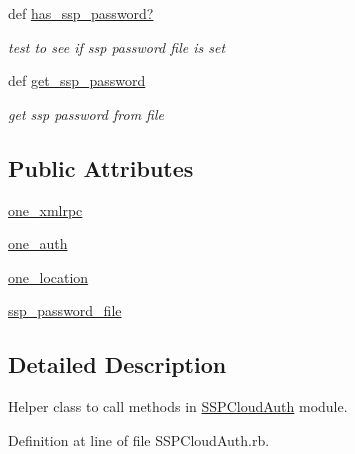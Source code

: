 \begin{DoxyCompactItemize}
\-d\-e\-f \hyperlink{classSSPCloudAuth_1_1SSP__Helper_a0d2f8ff4dba2536b8fbbdf83d2f8ff5f}{\-h\-a\-s\_\-\-s\-s\-p\_\-\-p\-a\-s\-s\-w\-o\-r\-d\-?}
\begin{DoxyCompactList}\small\item\em test to see if ssp password file is set \end{DoxyCompactList}\item 
\-d\-e\-f \hyperlink{classSSPCloudAuth_1_1SSP__Helper_aca8f8af38ea7a2ecd6a10dd6d42cb189}{\-g\-e\-t\_\-\-s\-s\-p\_\-\-p\-a\-s\-s\-w\-o\-r\-d}
\begin{DoxyCompactList}\small\item\em get ssp password from file \end{DoxyCompactList}\end{DoxyCompactItemize}
\subsection*{Public Attributes}
\begin{DoxyCompactItemize}
\item 
\hyperlink{classSSPCloudAuth_1_1SSP__Helper_af4a708fb05e6a3aa4c9e8777256b61a2}{\-o\-n\-e\_\-\-x\-m\-l\-r\-p\-c}
\item 
\hyperlink{classSSPCloudAuth_1_1SSP__Helper_adb350b4b2164baf39163c0e27f81c154}{\-o\-n\-e\_\-\-a\-u\-t\-h}
\item 
\hyperlink{classSSPCloudAuth_1_1SSP__Helper_adab308aadd3364bcaaec3f76256db689}{\-o\-n\-e\_\-\-l\-o\-c\-a\-t\-i\-o\-n}
\item 
\hyperlink{classSSPCloudAuth_1_1SSP__Helper_a9919dcc5d4e5e6f43d37eac2a14a41c8}{\-s\-s\-p\_\-\-p\-a\-s\-s\-w\-o\-r\-d\_\-\-f\-i\-l\-e}
\end{DoxyCompactItemize}


\subsection{Detailed Description}
Helper class to call methods in \hyperlink{namespaceSSPCloudAuth}{\-S\-S\-P\-C\-l\-o\-u\-d\-A\-u\-t\-h} module. 

Definition at line  of file \-S\-S\-P\-C\-l\-o\-u\-d\-A\-u\-t\-h\-.\-r\-b.



